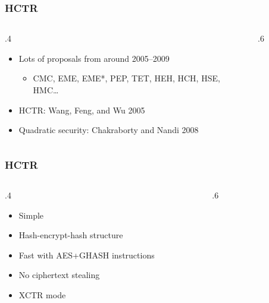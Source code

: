\documentclass[aspectratio=169]{beamer}
\newenvironment*{figslide}{
    \begin{columns}
        \begin{column}{.4\textwidth}

}{
\end{column}
\begin{column}{.6\textwidth}
    \begin{figure}
        
    \end{figure}
\end{column}
\end{columns}
}
\begin{document}
\begin{frame}

    \frametitle{HCTR}
        \begin{figslide}
            \begin{itemize}
                \item Lots of proposals from around 2005--2009
                \begin{itemize}
                    \item CMC, EME, EME*, PEP, TET, HEH, HCH, HSE, HMC\ldots
                \end{itemize}
                \item HCTR: Wang, Feng, and Wu 2005
                \item Quadratic security: Chakraborty and Nandi 2008
            \end{itemize}
        \end{figslide}
    \end{frame}
    \begin{frame}

\frametitle{HCTR}
    \begin{figslide}
        \begin{itemize}
            \item Simple
            \item Hash-encrypt-hash structure
            \item Fast with AES+GHASH instructions
            \item No ciphertext stealing
            \item XCTR mode
        \end{itemize}
    \end{figslide}
\end{frame}
\end{document}
